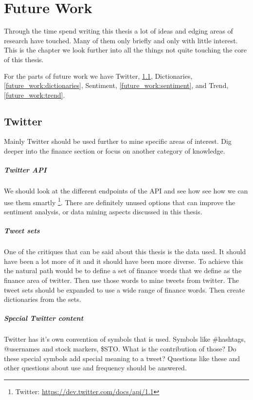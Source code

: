 \chapter{Future Work}\label{future_work}
Through the time spend writing this thesis a lot of ideas and edging areas of
research have touched. Many of them only briefly and only with little interest.
This is the chapter we look further into all the things not quite touching the
core of this thesis.   

For the parts of future work we have Twitter, \ref{future_work:twitter},
Dictionaries, \ref{future_work:dictionaries}, Sentiment,
\ref{future_work:sentiment}, and Trend, \ref{future_work:trend}.
%

\section{Twitter}\label{future_work:twitter}
Mainly Twitter should be used further to mine specific areas of interest. Dig
deeper into the finance section or focus on another category of knowledge.

\paragraph{Twitter API}
We should look at the different endpoints of the API and see how see how we can
use them smartly \footnote{Twitter: \url{https://dev.twitter.com/docs/api/1.1}}.
There are definitely unused options that can improve the sentiment analysis, or
data mining aspects discussed in this thesis. 

\paragraph{Tweet sets}
One of the critiques that can be said about this thesis is the data used. It
should have been a lot more of it and it should have been more diverse. To
achieve this the natural path would be to define a set of finance words that we
define as the finance area of twitter. Then use those words to mine tweets from
twitter. The tweet sets should be expanded to use a wide range of finance words.
Then create dictionaries from the sets. 

\paragraph{Special Twitter content}
Twitter has it's own convention of symbols that is used. Symbols like \#hashtags,
@usernames and stock markers, \$STO. What is the contribution of those? Do these
special symbols add special meaning to a tweet? Questions like these and other
questions about use and frequency should be answered. 

